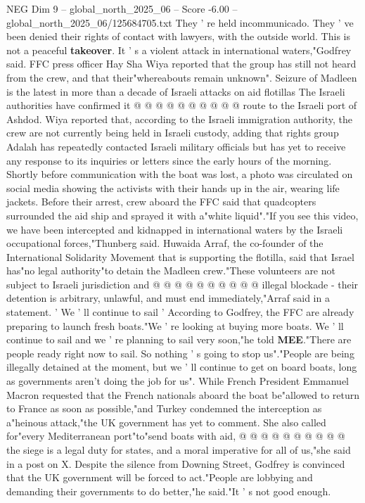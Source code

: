 \begin{textsample}{NEG Dim 9 – global\_north\_2025\_06 – Score -6.00 – global\_north\_2025\_06/125684705.txt}
They ' re held incommunicado.
They ' ve been denied their rights of contact with lawyers, with the outside world.
This is not a peaceful \textbf{takeover}.
It ' s a violent attack in international waters,"Godfrey said.
FFC press officer Hay Sha Wiya reported that the group has still not heard from the crew, and that their"whereabouts remain unknown".
Seizure of Madleen is the latest in more than a decade of Israeli attacks on aid flotillas The Israeli authorities have confirmed it @ @ @ @ @ @ @ @ @ @ route to the Israeli port of Ashdod.
Wiya reported that, according to the Israeli immigration authority, the crew are not currently being held in Israeli custody, adding that rights group Adalah has repeatedly contacted Israeli military officials but has yet to receive any response to its inquiries or letters since the early hours of the morning.
Shortly before communication with the boat was lost, a photo was circulated on social media showing the activists with their hands up in the air, wearing life jackets.
Before their arrest, crew aboard the FFC said that quadcopters surrounded the aid ship and sprayed it with a"white liquid"."If you see this video, we have been intercepted and kidnapped in international waters by the Israeli occupational forces,"Thunberg said.
Huwaida Arraf, the co-founder of the International Solidarity Movement that is supporting the flotilla, said that Israel has"no legal authority"to detain the Madleen crew."These volunteers are not subject to Israeli jurisdiction and @ @ @ @ @ @ @ @ @ @ illegal blockade - their detention is arbitrary, unlawful, and must end immediately,"Arraf said in a statement. ' We ' ll continue to sail ' According to Godfrey, the FFC are already preparing to launch fresh boats."We ' re looking at buying more boats.
We ' ll continue to sail and we ' re planning to sail very soon,"he told \textbf{MEE}."There are people ready right now to sail.
So nothing ' s going to stop us"."People are being illegally detained at the moment, but we ' ll continue to get on board boats, long as governments aren't doing the job for us".
While French President Emmanuel Macron requested that the French nationals aboard the boat be"allowed to return to France as soon as possible,"and Turkey condemned the interception as a"heinous attack,"the UK government has yet to comment.
She also called for"every Mediterranean port"to"send boats with aid, @ @ @ @ @ @ @ @ @ @ the siege is a legal duty for states, and a moral imperative for all of us,"she said in a post on X.
Despite the silence from Downing Street, Godfrey is convinced that the UK government will be forced to act."People are lobbying and demanding their governments to do better,"he said."It ' s not good enough.

\end{textsample}
